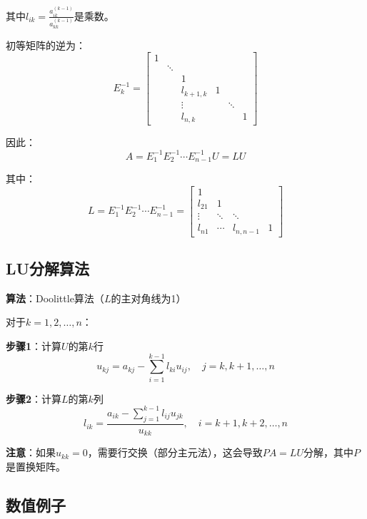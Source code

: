 \documentclass[12pt,a4paper]{article}
\begin{document}
其中$l_{ik} = \frac{a_{ik}^{(k-1)}}{a_{kk}^{(k-1)}}$是乘数。

初等矩阵的逆为：
\begin{equation}
E_k^{-1} = \begin{bmatrix}
1 & & & & & \\
& \ddots & & & & \\
& & 1 & & & \\
& & l_{k+1,k} & 1 & & \\
& & \vdots & & \ddots & \\
& & l_{n,k} & & & 1
\end{bmatrix}
\end{equation}

因此：
\begin{equation}
A = E_1^{-1} E_2^{-1} \cdots E_{n-1}^{-1} U = L U
\end{equation}

其中：
\begin{equation}
L = E_1^{-1} E_2^{-1} \cdots E_{n-1}^{-1} = \begin{bmatrix}
1 & & & \\
l_{21} & 1 & & \\
\vdots & \ddots & \ddots & \\
l_{n1} & \cdots & l_{n,n-1} & 1
\end{bmatrix}
\end{equation}

\subsection{LU分解算法}

\textbf{算法}：Doolittle算法（$L$的主对角线为1）

对于$k = 1, 2, \ldots, n$：

\textbf{步骤1}：计算$U$的第$k$行
\begin{equation}
u_{kj} = a_{kj} - \sum_{i=1}^{k-1} l_{ki} u_{ij}, \quad j = k, k+1, \ldots, n
\end{equation}

\textbf{步骤2}：计算$L$的第$k$列
\begin{equation}
l_{ik} = \frac{a_{ik} - \sum_{j=1}^{k-1} l_{ij} u_{jk}}{u_{kk}}, \quad i = k+1, k+2, \ldots, n
\end{equation}

\textbf{注意}：如果$u_{kk} = 0$，需要行交换（部分主元法），这会导致$PA = LU$分解，其中$P$是置换矩阵。

\subsection{数值例子}
\end{document}

